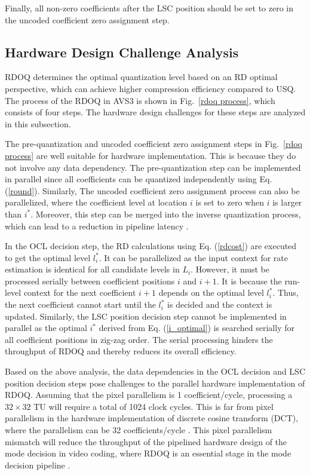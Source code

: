 \documentclass[lettersize,journal]{IEEEtran}
\begin{document}
Finally, all non-zero coefficients after the LSC position should be set to zero in the uncoded coefficient zero assignment step. 

\subsection{Hardware Design Challenge Analysis}
\label{subsec:B}
RDOQ determines the optimal quantization level based on an RD optimal perspective, which can achieve higher compression efficiency compared to USQ. The process of the RDOQ in AVS3 is shown in Fig.~\ref{rdoq process}, which consists of four steps. The hardware design challenges for these steps are analyzed in this subsection. 

The pre-quantization and uncoded coefficient zero assignment steps in Fig.~\ref{rdoq process} are well suitable for hardware implementation. This is because they do not involve any data dependency. The pre-quantization step can be implemented in parallel since all coefficients can be quantized independently using Eq. (\ref{round}). Similarly, The uncoded coefficient zero assignment process can also be parallelized, where the coefficient level at location $i$ is set to zero when $i$ is larger than $i_{}^{*}$. Moreover, this step can be merged into the inverse quantization process, which can lead to a reduction in pipeline latency \cite{braatz2018high}. 

In the OCL decision step, the RD calculations using Eq. (\ref{rdcost}) are executed to get the optimal level $l_{i}^{*}$. It can be parallelized as the input context for rate estimation is identical for all candidate levels in $L_{i}$. However, it must be processed serially between coefficient positions $i$ and $i+1$. It is because the run-level context for the next coefficient $i+1$ depends on the optimal level $l_{i}^{*}$. Thus, the next coefficient cannot start until the $l_{i}^{*}$ is decided and the context is updated. Similarly, the LSC position decision step cannot be implemented in parallel as the optimal $i_{}^{*}$ derived from Eq. (\ref{i_optimal}) is searched serially for all coefficient positions in zig-zag order. The serial processing hinders the throughput of RDOQ and thereby reduces its overall efficiency. 

Based on the above analysis, the data dependencies in the OCL decision and LSC position decision steps pose challenges to the parallel hardware implementation of RDOQ. Assuming that the pixel parallelism is 1 coefficient/cycle, processing a $32\times32$ TU will require a total of 1024 clock cycles. This is far from pixel parallelism in the hardware implementation of discrete cosine transform (DCT), where the parallelism can be 32 coefficients/cycle \cite{meher2013efficient,fan2019pipelined,Hao2023Multiple}. This pixel parallelism mismatch will reduce the throughput of the pipelined hardware design of the mode decision in video coding, where RDOQ is an essential stage in the mode decision pipeline \cite{sun2017fast,zhang2018efficient,huang2018three,zhang2018highly}.
\end{document}

